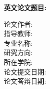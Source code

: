 {\begin{titlepage}
\begin{center}
    \par \vspace{0.5em}
    {\bfseries\songti\bf 英文论文题目: }\uline{\hfill{\fontsize{16}{20}\selectfont\mbox{\thesicnutitleea}} \hfill}
    \par \vspace{0.5em}
    \hspace{\MyCT}\uline{\hfill\textrm{\fontsize{16}{20}\selectfont\mbox{\thesicnutitleeb}} \hfill}
     \par \vspace{0.5em}
     \hspace{\MyCT}\uline{\hfill\textrm{\fontsize{16}{20}\selectfont\mbox{\thesicnutitleec}} \hfill}
    \par \vspace{2em}
    \begin{minipage}[t]{22em}
      论文作者: \uline{\hfill\fangsong\mbox{\thesicnuauthorc}\hfill}\\[0.5em]
      指导教师: \uline{\hfill\fangsong\mbox{\thesicnusupervisorc}\hfill}\\[0.5em]
      专业名称: \uline{\hfill\fangsong\mbox{\thesicnumajorc}\hfill}\\[0.5em]
      研究方向: \uline{\hfill\fangsong\mbox{\thesicnuresearch}\hfill}\\[0.5em]
      所在学院: \uline{\hfill\fangsong\mbox{\thesicnucollege}\hfill}\\[0.5em]
      论文提交日期: \uline{\hfill\fangsong\mbox{\thesicnudateofsubmit}}\\
      论文答辩日期: \uline{\hfill\fangsong\mbox{\thesicnudateofdefence}}
      \par
    \end{minipage}
  \end{center}
\end{titlepage}
\thispagestyle{empty}
\cleardoublepage
}



